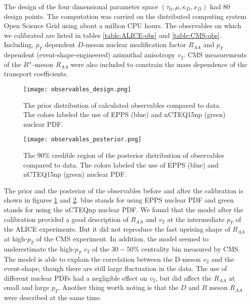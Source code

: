 The design of the four dimensional parameter space  $(\tau_0, \mu, \kappa_D, x_D)$ had 80 design points.
The computation was carried on the distributed computing system Open Science Grid \cite{Pordes:2007zzb,Sfiligoi:2010zz} using about a million CPU hours.
The observables on which we calibrated are listed in tables \ref{table:ALICE-obs} and \ref{table:CMS-obs}. 
Including, $p_T$ dependent $D$-meson nuclear modification factor $R_{AA}$ and $p_T$ dependent (event-shape-engineered) azimuthal anisotropy $v_2$.
CMS measurements of the $B^{\pm}$-meson $R_{AA}$ were also included to constrain the mass dependence of the transport coefficients.

\begin{figure}
\singlespacing
\texttt{[image: observables\_design.png]}
\caption[The prior distribution of calculated observables compared to data.]{The prior distribution of calculated observables compared to data. The colors labeled the use of EPPS (blue) and nCTEQ15np (green) nuclear PDF.}
\label{fig:LBT:obs_prior}
\end{figure}

\begin{figure}
\singlespacing
\texttt{[image: observables\_posterior.png]}
\caption[The 90\% credible region of the posterior distribution of observables]{The 90\% credible region of the posterior distribution of observables compared to data. The colors labeled the use of EPPS (blue) and nCTEQ15np (green) nuclear PDF.}
\label{fig:LBT:obs_posterior}
\end{figure}

The prior and the posterior of the observables before and after the calibration is shown in figures \ref{fig:LBT:obs_prior} and \ref{fig:LBT:obs_posterior}.
blue stands for using EPPS nuclear PDF and green stands for using the nCTEQnp nuclear PDF.
We found that the model after the calibration provided a good description of $R_{AA}$ and $v_2$ at the intermediate $p_T$ of the ALICE experiments.
But it did not reproduce the fast uprising shape of $R_{AA}$ at high-$p_T$ of the CMS experiment.
In addition, the model seemed to underestimate the high-$p_T$ $v_2$ of the $30-50\%$ centrality bin measured by CMS.
The model is able to explain the correlation between the D-meson $v_2$ and the event-shape, though there are still large fluctuation in the data.
The use of different nuclear PDFs had a negligible effect on $v_2$, but did affect the $R_{AA}$ at small and large $p_T$.
Another thing worth noting is that the $D$ and $B$ meson $R_{AA}$ were described at the same time.


